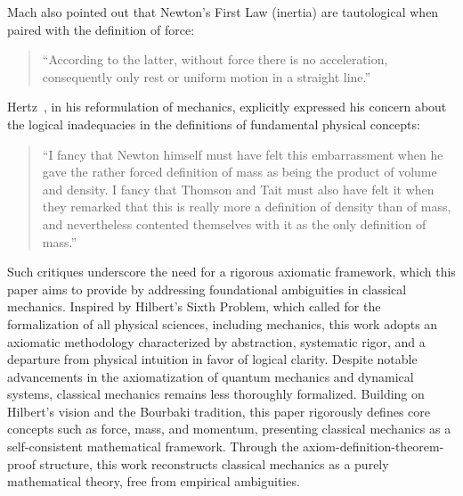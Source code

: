 \documentclass[12pt]{amsart}
\begin{document}
Mach also pointed out that Newton's First Law (inertia) are tautological when paired with the definition of force:
\begin{quote}
    ``According to the latter, without force there is no acceleration, consequently only rest or uniform motion in a straight line.''
\end{quote}


Hertz~\cite{hertz1899}, in his reformulation of mechanics, explicitly expressed his concern about the logical inadequacies in the definitions of fundamental physical concepts: 
\begin{quote}
    ``I fancy that Newton himself must have felt this embarrassment when he gave the rather forced definition of mass as being the product of volume and density. I fancy that Thomson and Tait must also have felt it when they remarked that this is really more a definition of density than of mass, and nevertheless contented themselves with it as the only definition of mass.''
\end{quote}

Such critiques underscore the need for a rigorous axiomatic framework, which this paper aims to provide by addressing foundational ambiguities in classical mechanics. Inspired by Hilbert's Sixth Problem, which called for the formalization of all physical sciences, including mechanics, this work adopts an axiomatic methodology characterized by abstraction, systematic rigor, and a departure from physical intuition in favor of logical clarity. Despite notable advancements in the axiomatization of quantum mechanics and dynamical systems, classical mechanics remains less thoroughly formalized. Building on Hilbert's vision and the Bourbaki tradition, this paper rigorously defines core concepts such as force, mass, and momentum, presenting classical mechanics as a self-consistent mathematical framework. Through the axiom-definition-theorem-proof structure, this work reconstructs classical mechanics as a purely mathematical theory, free from empirical ambiguities.
\end{document}
